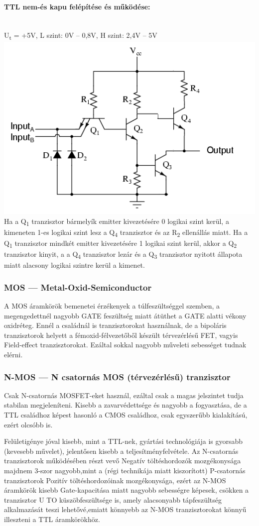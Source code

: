 \paragraph{TTL nem-és kapu felépítése és működése:}~\\
U\textsubscript{t} = +5V, L szint: 0V -- 0,8V, H szint: 2,4V -- 5V\\
\includegraphics[width=0.5\linewidth]{fig/11-TTL_NAND_schema}
Ha a Q\textsubscript{1} tranzisztor bármelyík emitter kivezetésére 0 logikai szint kerül, a kimeneten 1-es logikai szint lesz a Q\textsubscript{4} tranzisztor és az R\textsubscript{2} ellenállás miatt. Ha a Q\textsubscript{1} tranzisztor mindkét emitter kivezetésére 1 logikai szint kerül, akkor a Q\textsubscript{2} tranzisztor kinyit, a a Q\textsubscript{4} tranzisztor lezár és a Q\textsubscript{3} tranzisztor nyitott állapota miatt alacsony logikai szintre kerül a kimenet.

\subsubsection{MOS --- Metal-Oxid-Semiconductor}
A MOS áramkörök bemenetei érzékenyek a túlfeszültséggel szemben, a megengedettnél nagyobb GATE feszültség miatt átüthet a GATE alatti vékony oxidréteg. Ennél a családnál is tranzisztorokat használnak, de a bipoláris tranzisztorok helyett a fémoxid-félvezetőből készült térvezérlésű FET, vagyis Field-effect tranzisztorokat. Ezáltal sokkal nagyobb műveleti sebességet tudnak elérni.

\subsubsection{N-MOS --- N csatornás MOS (térvezérlésű) tranzisztor}
Csak N-csatornás MOSFET-eket használ, ezáltal csak a magas jelszintet tudja stabilan megjeleníteni. Kisebb a zavarvédettsége és nagyobb a fogyasztása, de a TTL családhoz képest hasonló a CMOS családhoz, csak egyszerűbb kialakítású, ezért olcsóbb is.

Felületigénye jóval kisebb, mint a TTL-nek, gyártási technológiája is gyorsabb (kevesebb művelet), jelentősen kisebb a teljesítményfelvétele. Az N-csatornás tranzisztorok működésében részt vevő Negatív töltéshordozók mozgékonysága majdnem 3-szor nagyobb,mint a (régi technikája miatt kiszorított) P-csatornás tranzisztorok Pozitív töltéshordozóinak mozgékonysága, ezért az N-MOS áramkörök kisebb Gate-kapacitása miatt nagyobb sebességre képesek, csökken a tranzisztor U TO küszöbfeszültsége is, amely alacsonyabb tápfeszültség alkalmazását teszi lehetővé,emiatt könnyebb az N-MOS tranzisztorokat könnyű illeszteni a TTL áramkörökhöz.

